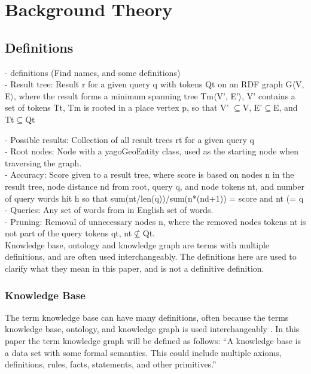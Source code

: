 \chapter{Background Theory}
\label{cha:background_theory}

\section{Definitions}
- definitions (Find names, and some definitions)\\
- Result tree: Result r for a given query q with tokens Qt on an RDF graph G$\langle$V, E$\rangle$, where the result forms a minimum spanning tree Tm$\langle$V', E'$\rangle$, V' contains a set of tokens Tt, Tm is rooted in a place vertex p, so that V' $\subseteq$V, E'$\subseteq$E, and Tt$\subseteq$Qt

- Possible results: Collection of all result trees rt for a given query q\\

- Root nodes: Node with a yagoGeoEntity class, used as the starting node when traversing the graph.\\

- Accuracy: Score given to a result tree, where score is based on nodes n in the result tree, node distance nd from root, query q, and node tokens nt, and number of query words hit h so that sum(nt/len(q))/sum(n*(nd+1)) = score and nt (= q\\

- Queries: Any set of words from in English set of words.\\

- Pruning: Removal of unnecessary nodes n, where the removed nodes tokens nt is not part of the query tokens qt, nt$\nsubseteq$Qt.\\


Knowledge base, ontology and knowledge graph are terms with multiple definitions, and are often used interchangeably. The definitions here are used to clarify what they mean in this paper, and is not a definitive definition.

\subsection{Knowledge Base}
The term knowledge base can have many definitions, often because the terms knowledge base, ontology, and knowledge graph is used interchangeably \cite{KGDef}. In this paper the term knowledge graph will be defined as follows: ``A knowledge base is a data set with some formal semantics. This could include multiple axioms, definitions, rules, facts, statements, and other primitives.'' \cite{davies2006semantic}

